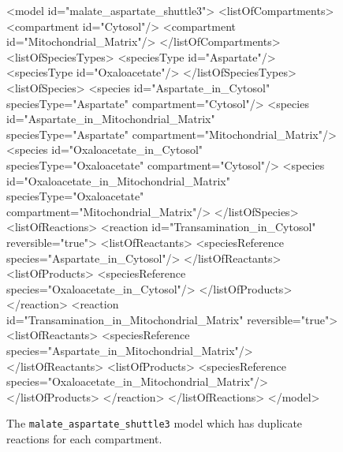 \documentclass{cekarticle}
\begin{document}
\begin{figure}[h]
\begin{example}
<model id="malate_aspartate_shuttle3">
    <listOfCompartments>
        <compartment id="Cytosol"/>
        <compartment id="Mitochondrial_Matrix"/>
    </listOfCompartments>
    <listOfSpeciesTypes>
        <speciesType id="Aspartate"/>
        <speciesType id="Oxaloacetate"/>
    </listOfSpeciesTypes>
    <listOfSpecies>
        <species
            id="Aspartate_in_Cytosol"
            speciesType="Aspartate"
            compartment="Cytosol"/>
        <species
            id="Aspartate_in_Mitochondrial_Matrix"
            speciesType="Aspartate"
            compartment="Mitochondrial_Matrix"/>
        <species
            id="Oxaloacetate_in_Cytosol"
            speciesType="Oxaloacetate"
            compartment="Cytosol"/>
        <species
            id="Oxaloacetate_in_Mitochondrial_Matrix"
            speciesType="Oxaloacetate"
            compartment="Mitochondrial_Matrix"/>
    </listOfSpecies>
    <listOfReactions>
        <reaction id="Transamination_in_Cytosol" reversible="true">
            <listOfReactants>
                <speciesReference species="Aspartate_in_Cytosol"/>
            </listOfReactants>
            <listOfProducts>
                <speciesReference species="Oxaloacetate_in_Cytosol"/>
            </listOfProducts>
        </reaction>
        <reaction id="Transamination_in_Mitochondrial_Matrix" reversible="true">
            <listOfReactants>
                <speciesReference species="Aspartate_in_Mitochondrial_Matrix"/>
            </listOfReactants>
            <listOfProducts>
                <speciesReference species="Oxaloacetate_in_Mitochondrial_Matrix"/>
            </listOfProducts>
        </reaction>
    </listOfReactions>
</model>
\end{example}
\caption{The \texttt{malate\_aspartate\_shuttle3} model which has duplicate reactions for each
compartment.}
\label{fig:malate_aspartate_shuttle3-xml}
\end{figure}
\end{document}
